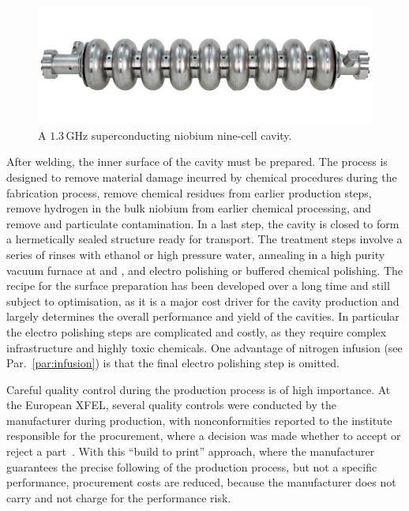 \begin{figure}[htbp]
   \includegraphics[width=\hsize]{chapters/figures/tesla9cell-cavity-2}
\caption{A $1.3\,{\mathrm{GHz}}$ superconducting niobium nine-cell cavity.
}
\label{fig:tesla-cavity}
\end{figure}

After welding, the inner surface of the cavity must be prepared.
The process is designed to remove material damage incurred by chemical procedures during the fabrication process, remove chemical residues from earlier production steps, remove hydrogen in the bulk niobium from earlier chemical processing, and remove and particulate contamination.
In a last step, the cavity is closed to form a hermetically sealed structure ready for transport.
The treatment steps involve a series of rinses with ethanol or high pressure water, annealing in a high purity vacuum furnace at  and , and electro polishing or buffered chemical polishing.
The recipe for the surface preparation has been developed over a long time and still subject to optimisation, as it is a major cost driver for the cavity production and largely determines the overall performance and yield of the cavities.
In particular the electro polishing steps are complicated and costly, as they require complex infrastructure and highly toxic chemicals.
One advantage of nitrogen infusion (see Par.~\ref{par:infusion}) is that the final electro polishing step is omitted.

Careful quality control during the production process is of high importance.
At the European XFEL, several quality controls were conducted by the manufacturer during production, with nonconformities reported to the institute responsible for the procurement, where a decision was made whether to accept or reject a part~\cite{Singer:2016fbf}. 
With this ``build to print'' approach, where the manufacturer guarantees the precise following of the production process, but not a specific performance, procurement costs are reduced, because the manufacturer does not carry and not charge for the performance risk.

